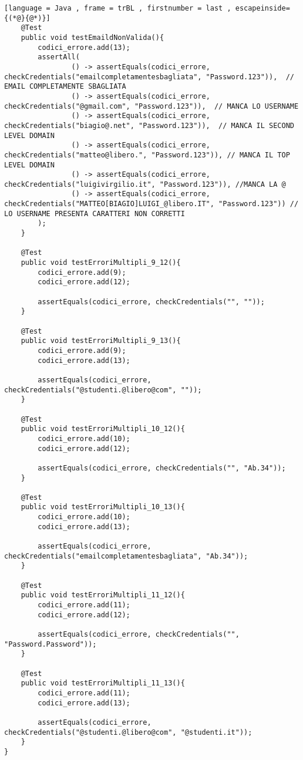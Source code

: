 \begin{lstlisting}[language = Java , frame = trBL , firstnumber = last , escapeinside={(*@}{@*)}]
    @Test
    public void testEmaildNonValida(){
        codici_errore.add(13);
        assertAll(
                () -> assertEquals(codici_errore, checkCredentials("emailcompletamentesbagliata", "Password.123")),  // EMAIL COMPLETAMENTE SBAGLIATA
                () -> assertEquals(codici_errore, checkCredentials("@gmail.com", "Password.123")),  // MANCA LO USERNAME
                () -> assertEquals(codici_errore, checkCredentials("biagio@.net", "Password.123")),  // MANCA IL SECOND LEVEL DOMAIN
                () -> assertEquals(codici_errore, checkCredentials("matteo@libero.", "Password.123")), // MANCA IL TOP LEVEL DOMAIN
                () -> assertEquals(codici_errore, checkCredentials("luigivirgilio.it", "Password.123")), //MANCA LA @
                () -> assertEquals(codici_errore, checkCredentials("MATTEO[BIAGIO]LUIGI_@libero.IT", "Password.123")) // LO USERNAME PRESENTA CARATTERI NON CORRETTI
        );
    }

    @Test
    public void testErroriMultipli_9_12(){
        codici_errore.add(9);
        codici_errore.add(12);

        assertEquals(codici_errore, checkCredentials("", ""));
    }

    @Test
    public void testErroriMultipli_9_13(){
        codici_errore.add(9);
        codici_errore.add(13);

        assertEquals(codici_errore, checkCredentials("@studenti.@libero@com", ""));
    }

    @Test
    public void testErroriMultipli_10_12(){
        codici_errore.add(10);
        codici_errore.add(12);

        assertEquals(codici_errore, checkCredentials("", "Ab.34"));
    }

    @Test
    public void testErroriMultipli_10_13(){
        codici_errore.add(10);
        codici_errore.add(13);

        assertEquals(codici_errore, checkCredentials("emailcompletamentesbagliata", "Ab.34"));
    }

    @Test
    public void testErroriMultipli_11_12(){
        codici_errore.add(11);
        codici_errore.add(12);

        assertEquals(codici_errore, checkCredentials("", "Password.Password"));
    }

    @Test
    public void testErroriMultipli_11_13(){
        codici_errore.add(11);
        codici_errore.add(13);

        assertEquals(codici_errore, checkCredentials("@studenti.@libero@com", "@studenti.it"));
    }
}

\end{lstlisting}



